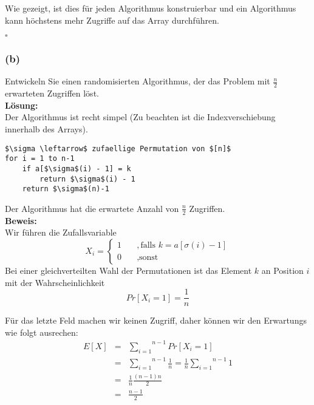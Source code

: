 \documentclass[11pt,a4paper,ngerman]{article}
\begin{document}
Wie gezeigt, ist dies für jeden Algorithmus konstruierbar und ein Algorithmus kann höchstens mehr Zugriffe auf das Array durchführen.

\mbox{} \hfill $\square$

\subsubsection*{(b)}

Entwickeln Sie einen randomisierten Algorithmus, der das Problem mit $\frac{n}{2}$ erwarteten Zugriffen löst.\\

\textbf{Lösung:}\\

Der Algorithmus ist recht simpel (Zu beachten ist die Indexverschiebung innerhalb des Arrays).

\begin{lstlisting}[mathescape=true]
$\sigma \leftarrow$ zufaellige Permutation von $[n]$
for i = 1 to n-1
    if a[$\sigma$(i) - 1] = k
        return $\sigma$(i) - 1
    return $\sigma$(n)-1
\end{lstlisting}

Der Algorithmus hat die erwartete Anzahl von $\frac{n}{2}$ Zugriffen.\\

\textbf{Beweis:}\\
    Wir führen die Zufallsvariable
    $$
        X_i = \left\{ \begin{array}{ll} 1 \quad &,\text{falls }k=a[\sigma(i)-1]\\ 0 &,\text{sonst} \end{array}\right.
    $$
    Bei einer gleichverteilten Wahl der Permutationen ist das Element $k$ an Position $i$
    mit der Wahrscheinlichkeit
    $$
        Pr[X_i = 1] = \frac{1}{n}
    $$

    Für das letzte Feld machen wir keinen Zugriff, daher können wir den Erwartungs wie folgt ausrechen:
    \begin{equation*}\begin{array}{rcl}
        E[X] &=& \overset{n-1}{\underset{i=1}{\sum}} Pr[X_i = 1]\\
            &=& \overset{n-1}{\underset{i=1}{\sum}} \frac{1}{n}
            = \frac{1}{n} \overset{n-1}{\underset{i=1}{\sum}} 1\\
            &=& \frac{1}{n} \frac{(n-1)n}{2}\\
            &=& \frac{n-1}{2}
    \end{array}\end{equation*}
\end{document}
